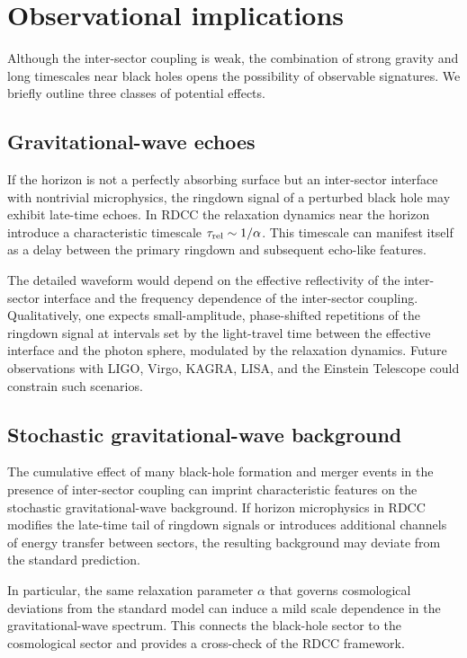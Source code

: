 \documentclass[11pt,a4paper]{article}
\begin{document}
\section{Observational implications}

Although the inter-sector coupling is weak, the combination of strong gravity and long timescales near black holes opens the possibility of observable signatures. We briefly outline three classes of potential effects.

\subsection{Gravitational-wave echoes}

If the horizon is not a perfectly absorbing surface but an inter-sector interface with nontrivial microphysics, the ringdown signal of a perturbed black hole may exhibit late-time echoes. In RDCC the relaxation dynamics near the horizon introduce a characteristic timescale \(\tau_{\rm rel} \sim 1/\alpha\). This timescale can manifest itself as a delay between the primary ringdown and subsequent echo-like features.

The detailed waveform would depend on the effective reflectivity of the inter-sector interface and the frequency dependence of the inter-sector coupling. Qualitatively, one expects small-amplitude, phase-shifted repetitions of the ringdown signal at intervals set by the light-travel time between the effective interface and the photon sphere, modulated by the relaxation dynamics. Future observations with LIGO, Virgo, KAGRA, LISA, and the Einstein Telescope could constrain such scenarios.

\subsection{Stochastic gravitational-wave background}

The cumulative effect of many black-hole formation and merger events in the presence of inter-sector coupling can imprint characteristic features on the stochastic gravitational-wave background. If horizon microphysics in RDCC modifies the late-time tail of ringdown signals or introduces additional channels of energy transfer between sectors, the resulting background may deviate from the standard prediction.

In particular, the same relaxation parameter \(\alpha\) that governs cosmological deviations from the standard model can induce a mild scale dependence in the gravitational-wave spectrum. This connects the black-hole sector to the cosmological sector and provides a cross-check of the RDCC framework.
\end{document}
